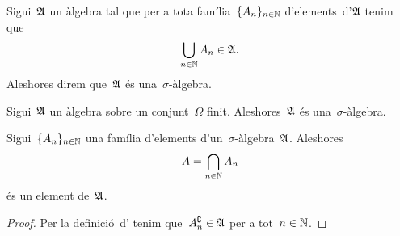 \documentclass[../Apunts.tex]{subfiles}
\begin{document}
	\begin{definition}
		\label{def:sigma àlgebra}
		Sigui~\(\mathfrak{A}\) un àlgebra tal que per a tota família~\(\{A_{n}\}_{n\in\mathbb{N}}\) d'elements~d'\(\mathfrak{A}\) tenim que
		\[\bigcup_{n\in\mathbb{N}}A_{n}\in\mathfrak{A}.\]
		Aleshores direm que~\(\mathfrak{A}\) és una~\(\sigma\)-àlgebra.
	\end{definition}
	\begin{observation}
		Sigui~\(\mathfrak{A}\) un àlgebra sobre un conjunt~\(\Omega\) finit. Aleshores~\(\mathfrak{A}\) és una~\(\sigma\)-àlgebra.
	\end{observation}
	\begin{proposition}
		\label{prop:les sigma àlgebras conserven interseccions numerables}
		Sigui~\(\{A_{n}\}_{n\in\mathbb{N}}\) una família d'elements d'un~\(\sigma\)-àlgebra~\(\mathfrak{A}\). Aleshores
		\[A=\bigcap_{n\in\mathbb{N}}A_{n}\]
		és un element de~\(\mathfrak{A}\).
		\begin{proof}
			Per la definició~d' tenim que~\(A_{n}^{\complement}\in\mathfrak{A}\) per a tot~\(n\in\mathbb{N}\). %
		\end{proof}
	\end{proposition}
\end{document}

